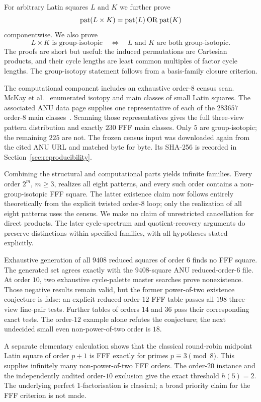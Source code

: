 For arbitrary Latin squares $L$ and $K$ we further prove
\[
  \operatorname{pat}(L\times K)=\operatorname{pat}(L)\mathbin{\mathrm{OR}}\operatorname{pat}(K)
\]
componentwise.  We also prove
\[
  L\times K\text{ is group-isotopic}
  \quad\Longleftrightarrow\quad
  L\text{ and }K\text{ are both group-isotopic}.
\]
The proofs are short but useful: the induced permutations are Cartesian
products, and their cycle lengths are least common multiples of factor cycle
lengths.  The group-isotopy statement follows from a basis-family closure
criterion.

The computational component includes an exhaustive order-$8$ census scan.
McKay et al.~\cite{McKayMeynertMyrvold2007} enumerated isotopy and main
classes of small Latin squares.  The associated ANU data page supplies one
representative of each of the $283657$ order-$8$ main
classes~\cite{McKayLatinData}.  Scanning those representatives gives the full
three-view pattern distribution and exactly $230$ FFF main classes.  Only
$5$ are group-isotopic; the remaining $225$ are not.  The frozen census
input was downloaded again from the cited ANU URL and matched byte for
byte.  Its SHA-256 is recorded in Section~\ref{sec:reproducibility}.

Combining the structural and computational parts yields infinite families.
Every order $2^m$, $m\geq 3$, realizes all eight patterns, and every such
order contains a non-group-isotopic FFF square.  The latter existence claim
now follows entirely theoretically from the explicit twisted order-$8$ loop;
only the realization of all eight patterns uses the census.  We make no claim
of unrestricted cancellation for direct products. The later
cycle-spectrum and quotient-recovery arguments do preserve distinctions
within specified families, with all hypotheses stated explicitly.

Exhaustive generation of all $9408$ reduced squares of order $6$
finds no FFF square.  The generated set agrees exactly with the $9408$-square
ANU reduced-order-$6$ file.  At order $10$, two exhaustive cycle-palette
master searches prove nonexistence.  Those negative results remain valid, but
the former power-of-two existence conjecture is false: an explicit reduced
order-$12$ FFF table passes all $198$ three-view line-pair tests.  Further
tables of orders $14$ and $36$ pass their corresponding exact tests.  The
order-$12$ example alone refutes the conjecture; the next undecided small
even non-power-of-two order is $18$.

A separate elementary calculation shows that the classical round-robin
midpoint Latin square of order $p+1$ is FFF exactly for primes
$p\equiv3\pmod8$. This supplies infinitely many non-power-of-two FFF
orders. The order-$20$ instance and the independently audited order-$10$
exclusion give the exact threshold $h(5)=2$. The underlying perfect
1-factorisation is classical; a broad priority claim for the FFF criterion
is not made.

